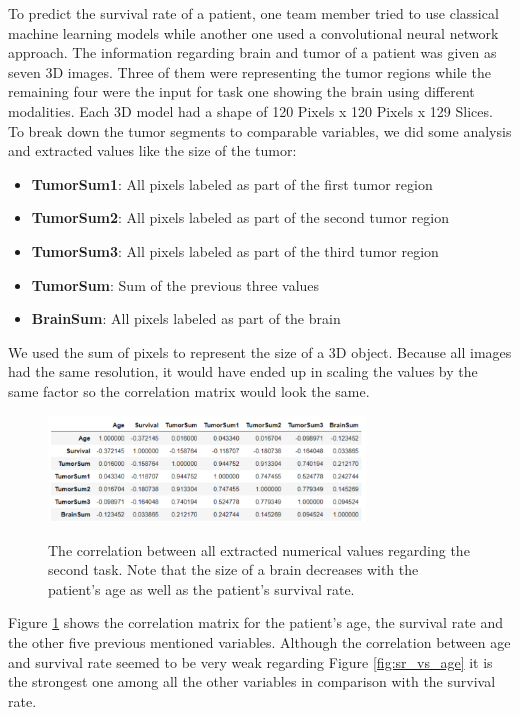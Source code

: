 \documentclass[a4paper,12pt,pagesize,headsepline,bibtotoc,titlepage]{scrartcl}
\begin{document}
To predict the survival rate of a patient, one team member tried to use classical machine learning models while another one used a convolutional neural network approach.
The information regarding brain and tumor of a patient was given as seven 3D images.
Three of them were representing the tumor regions while the remaining four were the input for task one showing the brain using different modalities.
Each 3D model had a shape of 120 Pixels x 120 Pixels x 129 Slices.
To break down the tumor segments to comparable variables, we did some analysis and extracted values like the size of the tumor:

\begin{itemize}
\item \textbf{TumorSum1}: All pixels labeled as part of the first tumor region
\item \textbf{TumorSum2}: All pixels labeled as part of the second tumor region
\item \textbf{TumorSum3}: All pixels labeled as part of the third tumor region
\item \textbf{TumorSum}: Sum of the previous three values
\item \textbf{BrainSum}: All pixels labeled as part of the brain
\end{itemize}

We used the sum of pixels to represent the size of a 3D object.
Because all images had the same resolution, it would have ended up in scaling the values by the same factor so the correlation matrix would look the same.

\begin{figure}[hbp]
\begin{center}
\includegraphics*[width=0.75\textwidth]{images/corr_matrix_numbers.png}\\
\caption{The correlation between all extracted numerical values regarding the second task. Note that the size of a brain decreases with the patient's age as well as the patient's survival rate.}
\label{fig:corr_matrix}
\end{center}
\end{figure}

Figure \ref{fig:corr_matrix} shows the correlation matrix for the patient's age, the survival rate and the other five previous mentioned variables.
Although the correlation between age and survival rate seemed to be very weak regarding Figure \ref{fig:sr_vs_age} it is the strongest one among all the other variables in comparison with the survival rate. \\
\end{document}
